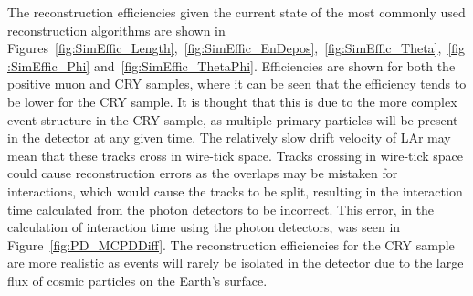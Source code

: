 The reconstruction efficiencies given the current state of the most commonly used reconstruction algorithms are shown in Figures~\ref{fig:SimEffic_Length},~\ref{fig:SimEffic_EnDepos},~\ref{fig:SimEffic_Theta},~\ref{fig:SimEffic_Phi} and~\ref{fig:SimEffic_ThetaPhi}. Efficiencies are shown for both the positive muon and CRY samples, where it can be seen that the efficiency tends to be lower for the CRY sample. It is thought that this is due to the more complex event structure in the CRY sample, as multiple primary particles will be present in the detector at any given time. The relatively slow drift velocity of LAr may mean that these tracks cross in wire-tick space. Tracks crossing in wire-tick space could cause reconstruction errors as the overlaps may be mistaken for interactions, which would cause the tracks to be split, resulting in the interaction time calculated from the photon detectors to be incorrect. This error, in the calculation of interaction time using the photon detectors, was seen in Figure~\ref{fig:PD_MCPDDiff}. The reconstruction efficiencies for the CRY sample are more realistic as events will rarely be isolated in the detector due to the large flux of cosmic particles on the Earth's surface. \\

